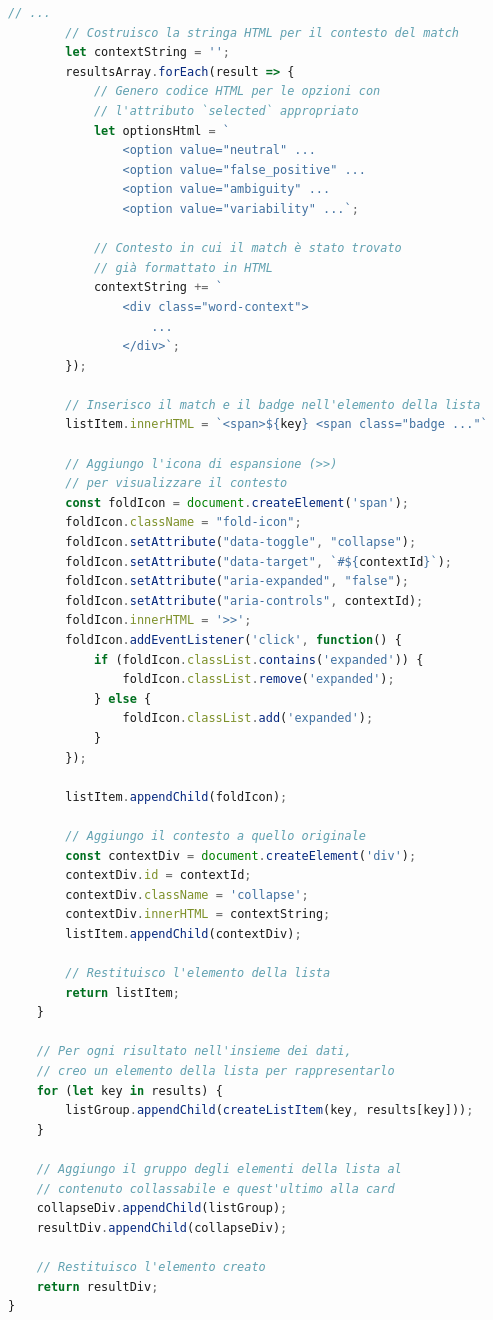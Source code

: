 \documentclass[12pt]{report}
\begin{document}
\begin{lstlisting}[language=JavaScript]
        // ...
        // Costruisco la stringa HTML per il contesto del match
        let contextString = '';
        resultsArray.forEach(result => {
            // Genero codice HTML per le opzioni con
            // l'attributo `selected` appropriato
            let optionsHtml = `
                <option value="neutral" ...
                <option value="false_positive" ...
                <option value="ambiguity" ...
                <option value="variability" ...`;

            // Contesto in cui il match è stato trovato
            // già formattato in HTML
            contextString += `
                <div class="word-context">
                    ...
                </div>`;
        });

        // Inserisco il match e il badge nell'elemento della lista
        listItem.innerHTML = `<span>${key} <span class="badge ..."`

        // Aggiungo l'icona di espansione (>>)
        // per visualizzare il contesto
        const foldIcon = document.createElement('span');
        foldIcon.className = "fold-icon";
        foldIcon.setAttribute("data-toggle", "collapse");
        foldIcon.setAttribute("data-target", `#${contextId}`);
        foldIcon.setAttribute("aria-expanded", "false");
        foldIcon.setAttribute("aria-controls", contextId);
        foldIcon.innerHTML = '>>';
        foldIcon.addEventListener('click', function() {
            if (foldIcon.classList.contains('expanded')) {
                foldIcon.classList.remove('expanded');
            } else {
                foldIcon.classList.add('expanded');
            }
        });

        listItem.appendChild(foldIcon);

        // Aggiungo il contesto a quello originale
        const contextDiv = document.createElement('div');
        contextDiv.id = contextId;
        contextDiv.className = 'collapse';
        contextDiv.innerHTML = contextString;
        listItem.appendChild(contextDiv);

        // Restituisco l'elemento della lista
        return listItem;
    }

    // Per ogni risultato nell'insieme dei dati,
    // creo un elemento della lista per rappresentarlo
    for (let key in results) {
        listGroup.appendChild(createListItem(key, results[key]));
    }

    // Aggiungo il gruppo degli elementi della lista al
    // contenuto collassabile e quest'ultimo alla card
    collapseDiv.appendChild(listGroup);
    resultDiv.appendChild(collapseDiv);

    // Restituisco l'elemento creato
    return resultDiv;
}
\end{lstlisting}
\end{document}
